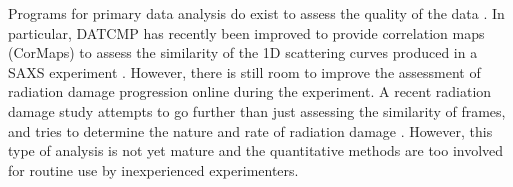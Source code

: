    Programs for primary data analysis do exist to assess the quality of the data \cite{petoukhov2012new}.
    In particular, DATCMP has recently been improved to provide correlation maps (CorMaps) to assess the similarity of the 1D scattering curves produced in a SAXS experiment \cite{franke2015correlation}.
    However, there is still room to improve the assessment of radiation damage progression online during the experiment.
    A recent radiation damage study attempts to go further than just assessing the similarity of frames, and tries to determine the nature and rate of radiation damage \cite{hopkins2016quantifying}.
    However, this type of analysis is not yet mature and the quantitative methods are too involved for routine use by inexperienced experimenters.
